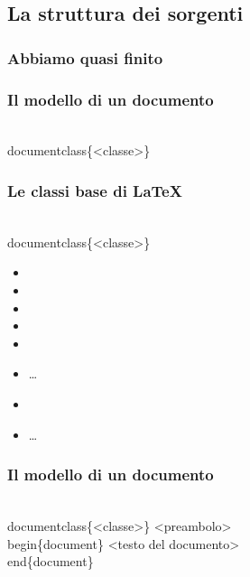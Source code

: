 \documentclass[10pt,svgnames,%
ucs,%
pdftex]{mybeamer}
\begin{document}
\subsection{La struttura dei sorgenti}
\begin{frame}
	\frametitle{Abbiamo quasi finito}
\end{frame}
\begin{frame}
	\frametitle{Il modello di un documento}
	\begin{LaTeXcode}
		\\documentclass\{\alert{<classe>}\}
	\end{LaTeXcode}
\end{frame}
\begin{frame}
	\frametitle{Le classi base di \LaTeX}
	\begin{LaTeXcode}
		\\documentclass\{\alert{<classe>}\}
	\end{LaTeXcode}
	\begin{itemize}
		\item{}
		\item{}
		\item{}
		\item{}
		\item{}
		\item\dots
		\item{}
		\item\dots
	\end{itemize}
\end{frame}
\begin{frame}
	\frametitle{Il modello di un documento}
	\begin{LaTeXcode}
		\\documentclass\{\alert{<classe>}\}\n
		\onslide<4->
		\hspace*{5ex}\alert{<preambolo>}\nn
		\onslide<2->
		\\begin\{document\}\n
		\onslide<3->
		\hspace*{5ex}\alert{<testo del documento>}\n
		\onslide<2->
		\\end\{document\}
	\end{LaTeXcode}
\end{frame}
\end{document}
